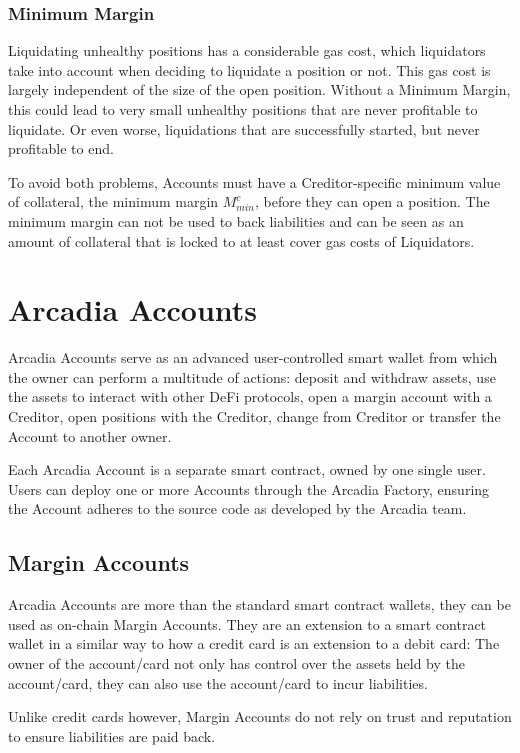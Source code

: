 \documentclass[sigconf,nonacm]{acmart}
\begin{document}
\subsubsection{Minimum Margin}
\label{subsubsec:minimum-margin}
Liquidating unhealthy positions has a considerable gas cost, which liquidators take into account when deciding to liquidate a position or not.
This gas cost is largely independent of the size of the open position.
Without a Minimum Margin, this could lead to very small unhealthy positions that are never profitable to liquidate.
Or even worse, liquidations that are successfully started, but never profitable to end.

To avoid both problems, Accounts must have a Creditor-specific minimum value of collateral, the minimum margin $M_{min}^c$, before they can open a position.
The minimum margin can not be used to back liabilities and can be seen as an amount of collateral that is locked to at least cover gas costs of Liquidators.

\section{Arcadia Accounts}
\label{sec:arcadia-accounts}
Arcadia Accounts serve as an advanced user-controlled smart wallet from which the owner can perform a multitude of actions: deposit and withdraw assets,
use the assets to interact with other DeFi protocols, open a margin account with a Creditor, open positions with the Creditor,
change from Creditor or transfer the Account to another owner.

Each Arcadia Account is a separate smart contract, owned by one single user.
Users can deploy one or more Accounts through the Arcadia Factory, ensuring the Account adheres to the source code as developed by the Arcadia team.

\subsection{Margin Accounts}
\label{subsec:margin-accounts}
Arcadia Accounts are more than the standard smart contract wallets, they can be used as on-chain Margin Accounts.
They are an extension to a smart contract wallet in a similar way to how a credit card is an extension to a debit card:
The owner of the account/card not only has control over the assets held by the account/card,
they can also use the account/card to incur liabilities.

Unlike credit cards however, Margin Accounts do not rely on trust and reputation to ensure liabilities are paid back.
\end{document}
